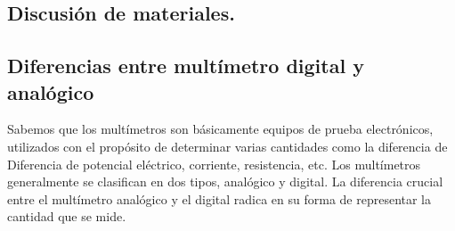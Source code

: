 \documentclass[10pt]{article}
\begin{document}
\begin{multicols}{2}
\section{Discusión de materiales.}

\subsection{Diferencias entre multímetro digital y analógico}

Sabemos que los multímetros son básicamente equipos de prueba electrónicos, utilizados con el propósito de determinar varias cantidades como la diferencia de Diferencia de potencial eléctrico, corriente, resistencia, etc. Los multímetros generalmente se clasifican en dos tipos, analógico y digital. La diferencia crucial entre el multímetro analógico y el digital radica en su forma de representar la cantidad que se mide.

\begin{center}


\end{center}
\end{multicols}
\end{document}
